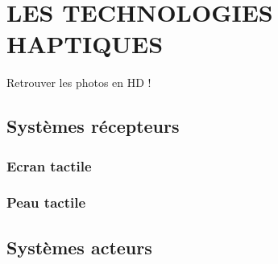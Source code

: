 \chapter{LES TECHNOLOGIES HAPTIQUES}
Retrouver les photos en HD !\par

\section{Systèmes récepteurs}
\subsection{Ecran tactile}
\subsection{Peau tactile}

\section{Systèmes acteurs}

